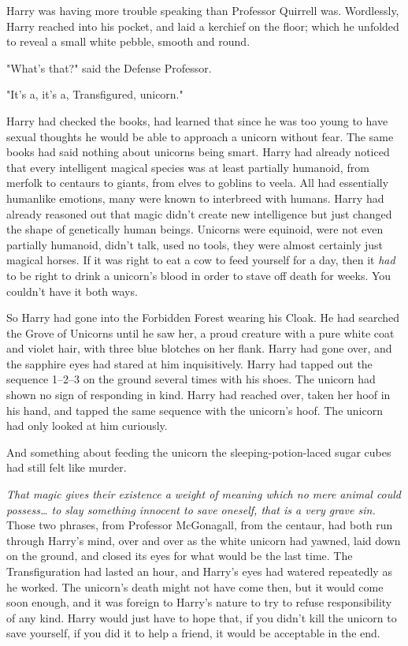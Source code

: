 Harry was having more trouble speaking than Professor Quirrell was. Wordlessly,
Harry reached into his pocket, and laid a kerchief on the floor; which he
unfolded to reveal a small white pebble, smooth and round.

"What's that?" said the Defense Professor.

"It's a, it's a, Transfigured, unicorn."

Harry had checked the books, had learned that since he was too young to have
sexual thoughts he would be able to approach a unicorn without fear. The same
books had said nothing about unicorns being smart. Harry had already noticed
that every intelligent magical species was at least partially humanoid, from
merfolk to centaurs to giants, from elves to goblins to veela. All had
essentially humanlike emotions, many were known to interbreed with humans.
Harry had already reasoned out that magic didn't create new intelligence but
just changed the shape of genetically human beings. Unicorns were equinoid,
were not even partially humanoid, didn't talk, used no tools, they were almost
certainly just magical horses. If it was right to eat a cow to feed yourself
for a day, then it \emph{had} to be right to drink a unicorn's blood in order
to stave off death for weeks. You couldn't have it both ways.

So Harry had gone into the Forbidden Forest wearing his Cloak. He had searched
the Grove of Unicorns until he saw her, a proud creature with a pure white coat
and violet hair, with three blue blotches on her flank. Harry had gone over,
and the sapphire eyes had stared at him inquisitively. Harry had tapped out the
sequence 1--{2}--{3} on the ground several times with his shoes. The unicorn had
shown no sign of responding in kind. Harry had reached over, taken her hoof in
his hand, and tapped the same sequence with the unicorn's hoof. The unicorn had
only looked at him curiously.

And something about feeding the unicorn the sleeping-potion-laced sugar cubes
had still felt like murder.

\emph{That magic gives their existence a weight of meaning which no mere animal
could possess{\ldots} to slay something innocent to save oneself, that is a
very grave sin.} Those two phrases, from Professor McGonagall, from the
centaur, had both run through Harry's mind, over and over as the white unicorn
had yawned, laid down on the ground, and closed its eyes for what would be the
last time. The Transfiguration had lasted an hour, and Harry's eyes had watered
repeatedly as he worked. The unicorn's death might not have come then, but it
would come soon enough, and it was foreign to Harry's nature to try to refuse
responsibility of any kind. Harry would just have to hope that, if you didn't
kill the unicorn to save yourself, if you did it to help a friend, it would be
acceptable in the end.

